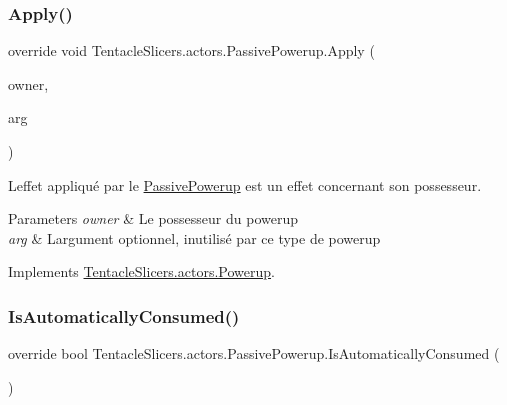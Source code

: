 \subsubsection{\texorpdfstring{Apply()}{Apply()}}
{\footnotesize\ttfamily override void Tentacle\+Slicers.\+actors.\+Passive\+Powerup.\+Apply (\begin{DoxyParamCaption}\item[{\hyperlink{class_tentacle_slicers_1_1actors_1_1_player_character}{Player\+Character}}]{owner,  }\item[{int}]{arg }\end{DoxyParamCaption})\hspace{0.3cm}{\ttfamily [virtual]}}



L\textquotesingle{}effet appliqué par le \hyperlink{class_tentacle_slicers_1_1actors_1_1_passive_powerup}{Passive\+Powerup} est un effet concernant son possesseur. 


\begin{DoxyParams}{Parameters}
{\em owner} & Le possesseur du powerup \\
\hline
{\em arg} & L\textquotesingle{}argument optionnel, inutilisé par ce type de powerup \\
\hline
\end{DoxyParams}


Implements \hyperlink{class_tentacle_slicers_1_1actors_1_1_powerup_a65355e6ca82f35ca0d4ff111c03c8eee}{Tentacle\+Slicers.\+actors.\+Powerup}.

\mbox{\label{class_tentacle_slicers_1_1actors_1_1_passive_powerup_ac419aee4a7dfedee68728f747565f47f}} 
\subsubsection{\texorpdfstring{Is\+Automatically\+Consumed()}{IsAutomaticallyConsumed()}}
{\footnotesize\ttfamily override bool Tentacle\+Slicers.\+actors.\+Passive\+Powerup.\+Is\+Automatically\+Consumed (\begin{DoxyParamCaption}{ }\end{DoxyParamCaption})\hspace{0.3cm}{\ttfamily [virtual]}}



